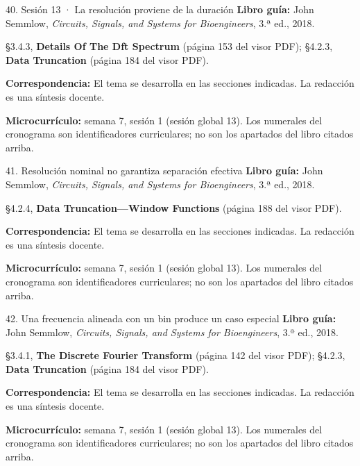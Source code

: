 \documentclass[
  10pt,
  ignorenonframetext,
  aspectratio=169,
  spanish,
]{beamer}
\begin{document}
\begin{frame}{40. Sesión 13 · La resolución proviene de la duración}
\label{sesiuxf3n-13-la-resoluciuxf3n-proviene-de-la-duraciuxf3n}
\textbf{Libro guía:} John Semmlow, \emph{Circuits, Signals, and Systems
for Bioengineers}, 3.ª ed., 2018.

§3.4.3, \textbf{Details Of The Dft Spectrum} (página 153 del visor PDF);
§4.2.3, \textbf{Data Truncation} (página 184 del visor PDF).

\textbf{Correspondencia:} El tema se desarrolla en las secciones
indicadas. La redacción es una síntesis docente.

\textbf{Microcurrículo:} semana 7, sesión 1 (sesión global 13). Los
numerales del cronograma son identificadores curriculares; no son los
apartados del libro citados arriba.
\end{frame}

\begin{frame}{41. Resolución nominal no garantiza separación efectiva}
\label{resoluciuxf3n-nominal-no-garantiza-separaciuxf3n-efectiva}
\textbf{Libro guía:} John Semmlow, \emph{Circuits, Signals, and Systems
for Bioengineers}, 3.ª ed., 2018.

§4.2.4, \textbf{Data Truncation---Window Functions} (página 188 del
visor PDF).

\textbf{Correspondencia:} El tema se desarrolla en las secciones
indicadas. La redacción es una síntesis docente.

\textbf{Microcurrículo:} semana 7, sesión 1 (sesión global 13). Los
numerales del cronograma son identificadores curriculares; no son los
apartados del libro citados arriba.
\end{frame}

\begin{frame}{42. Una frecuencia alineada con un bin produce un caso
especial}
\label{una-frecuencia-alineada-con-un-bin-produce-un-caso-especial}
\textbf{Libro guía:} John Semmlow, \emph{Circuits, Signals, and Systems
for Bioengineers}, 3.ª ed., 2018.

§3.4.1, \textbf{The Discrete Fourier Transform} (página 142 del visor
PDF); §4.2.3, \textbf{Data Truncation} (página 184 del visor PDF).

\textbf{Correspondencia:} El tema se desarrolla en las secciones
indicadas. La redacción es una síntesis docente.

\textbf{Microcurrículo:} semana 7, sesión 1 (sesión global 13). Los
numerales del cronograma son identificadores curriculares; no son los
apartados del libro citados arriba.
\end{frame}
\end{document}

